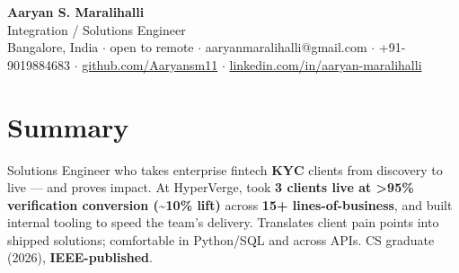 \documentclass[10pt,a4paper]{article}
\begin{document}
\vspace*{-1cm}
\begin{center}
{\LARGE\bfseries Aaryan S. Maralihalli}\\[0.5em]
{\large Integration / Solutions Engineer}\\[0.3em]
Bangalore, India $\cdot$ open to remote $\cdot$ aaryanmaralihalli@gmail.com $\cdot$ +91-9019884683 $\cdot$ \href{https://github.com/Aaryansm11}{github.com/Aaryansm11} $\cdot$ \href{https://linkedin.com/in/aaryan-maralihalli}{linkedin.com/in/aaryan-maralihalli}
\end{center}\vspace{0.4ex}
\section*{Summary}
Solutions Engineer who takes enterprise fintech \textbf{KYC} clients from discovery to live --- and proves impact. At HyperVerge, took \textbf{3 clients live at \textgreater{}95\% verification conversion (\textasciitilde{}10\% lift)} across \textbf{15+ lines-of-business}, and built internal tooling to speed the team's delivery. Translates client pain points into shipped solutions; comfortable in Python/SQL and across APIs. CS graduate (2026), \textbf{IEEE-published}.\par\vspace{2pt}
\end{document}
